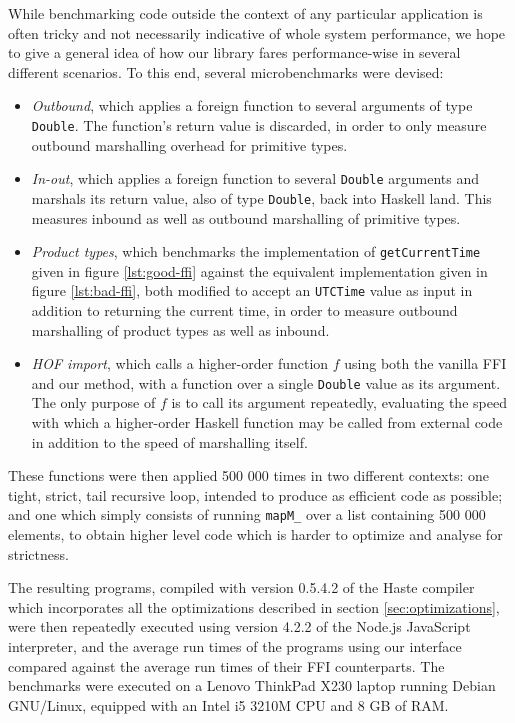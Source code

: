\documentclass[preprint]{sigplanconf}
\begin{document}
While benchmarking code outside the context of any particular application is
often tricky and not necessarily indicative of whole system performance,
we hope to give a general idea of how our library fares performance-wise in
several different scenarios.
To this end, several microbenchmarks were devised:

\begin{itemize}
\item
  \emph{Outbound}, which applies a foreign function to several arguments of
  type \lstinline!Double!. The function's return value is discarded, in order
  to only measure outbound marshalling overhead for primitive types.
\item
  \emph{In-out}, which applies a foreign function to several \lstinline!Double!
  arguments and marshals its return value, also of type \lstinline!Double!,
  back into Haskell land. This measures inbound as well as outbound marshalling
  of primitive types.
\item
  \emph{Product types}, which benchmarks the implementation of\linebreak
  \lstinline!getCurrentTime! given in figure \ref{lst:good-ffi} against
  the equivalent implementation given in figure \ref{lst:bad-ffi}, both
  modified to accept an \lstinline!UTCTime! value as input in addition to
  returning the current time, in order to measure outbound marshalling of
  product types as well as inbound.
\item
  \emph{HOF import}, which calls a higher-order function $f$ using
  both the vanilla FFI and our method, with a function over a
  single \lstinline!Double! value as its argument.
  The only purpose of $f$ is to call its argument repeatedly,
  evaluating the speed with which a higher-order Haskell function may be called
  from external code in addition to the speed of marshalling itself.
\end{itemize}

These functions were then applied 500 000 times in two different contexts: one
tight, strict, tail recursive loop, intended to produce as efficient code
as possible; and one which simply consists of running \lstinline!mapM_! over
a list containing 500 000 elements, to obtain higher level code which is harder to
optimize and analyse for strictness.

The resulting programs, compiled with version 0.5.4.2 of the Haste compiler
which incorporates all the optimizations described in section \ref{sec:optimizations},
were then repeatedly executed using version 4.2.2 of the Node.js JavaScript interpreter,
and the average run times of the programs using our interface compared against
the average run times of their FFI counterparts.
The benchmarks were executed on a Lenovo ThinkPad X230 laptop running Debian GNU/Linux,
equipped with an Intel i5 3210M CPU and 8 GB of RAM.
\end{document}
